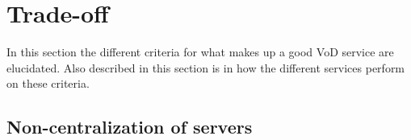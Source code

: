\section{Trade-off}
In this section the different criteria for what makes up a good VoD service are elucidated. Also described in this section is in how the different services perform on these criteria.

\subsection{Non-centralization of servers}
\label{sec:central)
When no central servers are used, the service has low hardware maintenance costs. Further more in a central server way, if the server fails, data might be lost and the service is out of order, this can not happen in a non-centralized approach with enough users, making the non-centralized approach highly reliable. This also means that every user is part of the solution, making it a community driven approach, where every user has influence on the system(in terms of availability and range of content), the size of this influence depends on the number of users connected.
Of the VoD services that were previously described, only Tribler currently uses a non-centralized approach. To implement non-centralization into one of the other services would be far beyond the scope of this project due to the size and state of maturity of the those services and therefor the time it would take to switch to non-centralization. 
}
